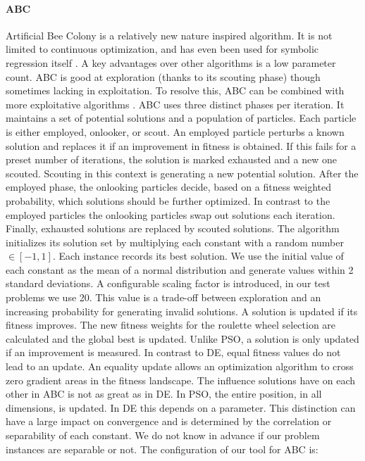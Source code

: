 \paragraph{ABC}
Artificial Bee Colony \citep{ABC} is a relatively new nature inspired algorithm. It is not limited to continuous optimization, and has even been used for symbolic regression itself \cite{ABCSR}. A key advantages over other algorithms is a low parameter count. ABC is good at exploration (thanks to its scouting phase) though sometimes lacking in exploitation. To resolve this, ABC can be combined with more exploitative algorithms \citep{ABCPSO}.
ABC uses three distinct phases per iteration. It maintains a set of potential solutions and a population of particles. Each particle is either employed, onlooker, or scout. An employed particle perturbs a known solution and replaces it if an improvement in fitness is obtained. If this fails for a preset number of iterations, the solution is marked exhausted and a new one scouted. Scouting in this context is generating a new potential solution. After the employed phase, the onlooking particles decide, based on a fitness weighted probability, which solutions should be further optimized. In contrast to the employed particles the onlooking particles swap out solutions each iteration. Finally, exhausted solutions are replaced by scouted solutions.
The algorithm initializes its solution set by multiplying each constant with a random number $\in [-1,1]$. Each instance records its best solution. We use the initial value of each constant as the mean of a normal distribution and generate values within 2 standard deviations. A configurable scaling factor is introduced, in our test problems we use 20. This value is a trade-off between exploration and an increasing probability for generating invalid solutions. A solution is updated if its fitness improves. The new fitness weights for the roulette wheel selection are calculated and the global best is updated. Unlike PSO, a solution is only updated if an improvement is measured. In contrast to DE, equal fitness values do not lead to an update. An equality update allows an optimization algorithm to cross zero gradient areas in the fitness landscape. The influence solutions have on each other in ABC is not as great as in DE. In PSO, the entire position, in all dimensions, is updated. In DE this depends on a parameter. This distinction can have a large impact on convergence and is determined by the correlation or separability of each constant.
We do not know in advance if our problem instances are separable or not. The configuration of our tool for ABC is: 

